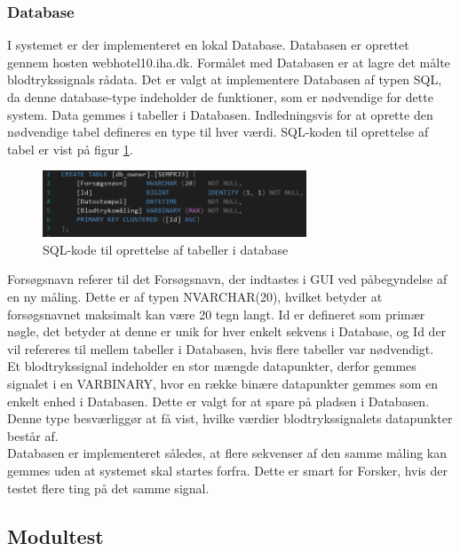 \subsubsection{Database}
I systemet er der implementeret en lokal Database. Databasen er oprettet gennem hosten webhotel10.iha.dk. Formålet med Databasen er at lagre det målte blodtrykssignals rådata. Det er valgt at implementere Databasen af typen SQL, da denne database-type indeholder de funktioner, som er nødvendige for dette system. Data gemmes i tabeller i Databasen. Indledningsvis for at oprette den nødvendige tabel defineres en type til hver værdi. SQL-koden til oprettelse af tabel er vist på figur \ref{fig:SQL-kode}.
\begin{figure}[H]
	\centering
	\includegraphics[width=0.7\textwidth]{Figurer/SQLDatabase}
	\caption{SQL-kode til oprettelse af tabeller i database}
	\label{fig:SQL-kode}
\end{figure}
Forsøgsnavn referer til det Forsøgsnavn, der indtastes i GUI ved påbegyndelse af en ny måling. Dette er af typen NVARCHAR(20), hvilket betyder at forsøgsnavnet maksimalt kan være 20 tegn langt. Id er defineret som primær nøgle, det betyder at denne er unik for hver enkelt sekvens i Database, og Id der vil refereres til mellem tabeller i Databasen, hvis flere tabeller var nødvendigt. \\  
Et blodtrykssignal indeholder en stor mængde datapunkter, derfor gemmes signalet i en VARBINARY, hvor en række binære datapunkter gemmes som en enkelt enhed i Databasen. Dette er valgt for at spare på pladsen i Databasen. Denne type besværliggør at få vist, hvilke værdier blodtrykssignalets datapunkter består af. \\
Databasen er implementeret således, at flere sekvenser af den samme måling kan gemmes uden at systemet skal startes forfra. Dette er smart for Forsker, hvis der testet flere ting på det samme signal.  

\subsection{Modultest}

